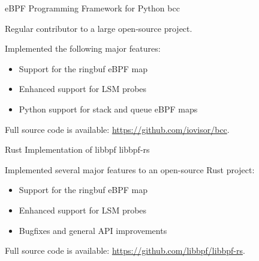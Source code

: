 \begin{cventries}

  \cventry
    {eBPF Programming Framework for Python} %
    {bcc} %
    {} %
    {} %
    {
      \begin{cvitems} %
        \item Regular contributor to a large open-source project.
        \item Implemented the following major features:
        \begin{itemize}
          \item {Support for the ringbuf eBPF map}
          \item {Enhanced support for LSM probes}
          \item {Python support for stack and queue eBPF maps}
        \end{itemize}
        \item Full source code is available: \url{https://github.com/iovisor/bcc}.
      \end{cvitems}
    }

  \cventry
    {Rust Implementation of libbpf} %
    {libbpf-rs} %
    {} %
    {} %
    {
      \begin{cvitems} %
        \item Implemented several major features to an open-source Rust project:
        \begin{itemize}
          \item {Support for the ringbuf eBPF map}
          \item {Enhanced support for LSM probes}
          \item {Bugfixes and general API improvements}
        \end{itemize}
        \item Full source code is available: \url{https://github.com/libbpf/libbpf-rs}.
      \end{cvitems}
    }

\end{cventries}

